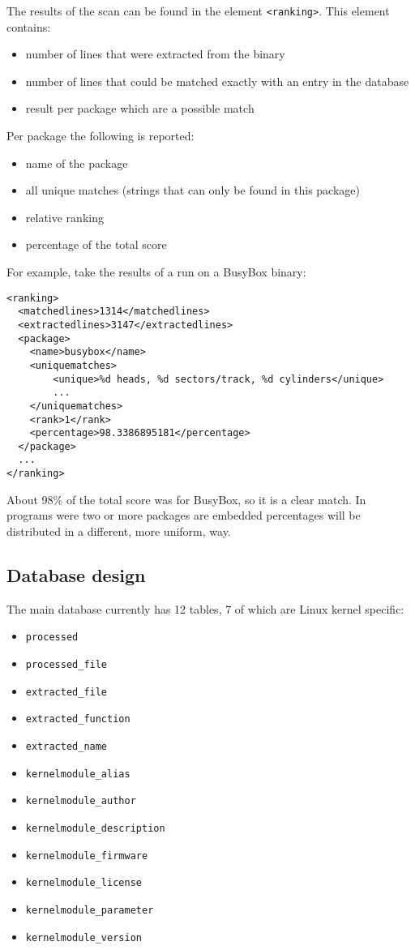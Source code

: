 \documentclass[10pt]{article}
\begin{document}
The results of the scan can be found in the element \texttt{<ranking>}. This
element contains:

\begin{itemize}
\item number of lines that were extracted from the binary
\item number of lines that could be matched exactly with an entry in the
database
\item result per package which are a possible match
\end{itemize}

Per package the following is reported:

\begin{itemize}
\item name of the package
\item all unique matches (strings that can only be found in this package)
\item relative ranking
\item percentage of the total score
\end{itemize}

For example, take the results of a run on a BusyBox binary:

\begin{verbatim}
<ranking>
  <matchedlines>1314</matchedlines>
  <extractedlines>3147</extractedlines>
  <package>
    <name>busybox</name>
    <uniquematches>
        <unique>%d heads, %d sectors/track, %d cylinders</unique>
        ...
    </uniquematches>
    <rank>1</rank>
    <percentage>98.3386895181</percentage>
  </package>
  ...
</ranking>
\end{verbatim}

About 98\% of the total score was for BusyBox, so it is a clear match. In
programs were two or more packages are embedded percentages will be distributed
in a different, more uniform, way.

\subsection{Database design}

The main database currently has 12 tables, 7 of which are Linux kernel specific:

\begin{itemize}
\item \texttt{processed}
\item \texttt{processed\_file}
\item \texttt{extracted\_file}
\item \texttt{extracted\_function}
\item \texttt{extracted\_name}
\item \texttt{kernelmodule\_alias}
\item \texttt{kernelmodule\_author}
\item \texttt{kernelmodule\_description}
\item \texttt{kernelmodule\_firmware}
\item \texttt{kernelmodule\_license}
\item \texttt{kernelmodule\_parameter}
\item \texttt{kernelmodule\_version}
\end{itemize}
\end{document}
